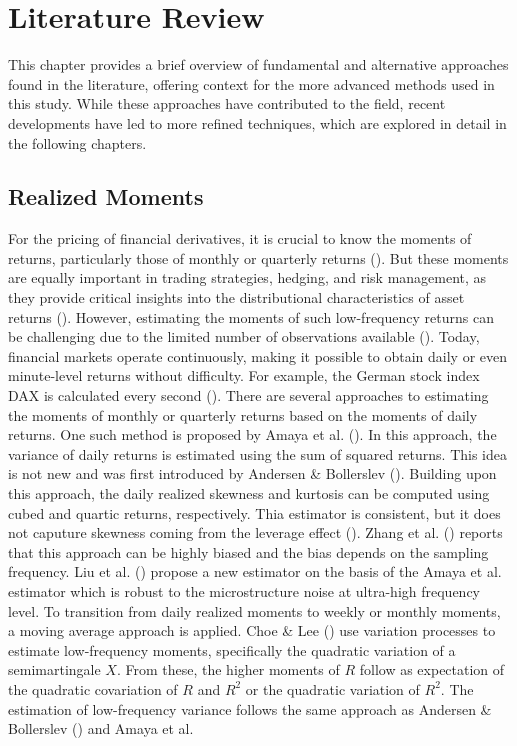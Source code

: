 \chapter{Literature Review}
\label{sec:literature}

This chapter provides a brief overview of fundamental and alternative approaches found in the literature, offering context for the more advanced methods used in this study. While these approaches have contributed to the field, recent developments have led to more refined techniques, which are explored in detail in the following chapters.

\section{Realized Moments}
For the pricing of financial derivatives, it is crucial to know the moments of returns, particularly those of monthly or quarterly returns (\cite{barroRareDisastersAsset2006}). But these moments are equally important in trading strategies, hedging, and risk management, as they provide critical insights into the distributional characteristics of asset returns (\cite{brooksOptimalHedgingHigher2012,jorionRiskManagementLessons1999,sheuEffectiveOptionsTrading2011}). However, estimating the moments of such low-frequency returns can be challenging due to the limited number of observations available (\cite{neubergerSkewnessStockMarket2021}). Today, financial markets operate continuously, making it possible to obtain daily or even minute-level returns without difficulty. For example, the German stock index DAX is calculated every second (\cite{boersefrankfurtFunktioniertBoerse}). There are several approaches to estimating the moments of monthly or quarterly returns based on the moments of daily returns. One such method is proposed by Amaya et al. (\citeyear{amayaDoesRealizedSkewness2015}). In this approach, the variance of daily returns is estimated using the sum of squared returns. This idea is not new and was first introduced by Andersen \& Bollerslev (\citeyear{andersenAnsweringSkepticsYes1998}). Building upon this approach, the daily realized skewness and kurtosis can be computed using cubed and quartic returns, respectively. Thia estimator is consistent, but it does not caputure skewness coming from the leverage effect (\cite{galloDynamicTailRisk2024}). Zhang et al. (\citeyear{zhangTaleTwoTime2005}) reports that this approach can be highly biased and the bias depends on the sampling frequency. Liu et al. (\citeyear{liuRealizedSkewnessHigh2014}) propose a new estimator on the basis of the Amaya et al. estimator which is robust to the microstructure noise at ultra-high frequency level. To transition from daily realized moments to weekly or monthly moments, a moving average approach is applied. Choe \& Lee (\citeyear{choeHighMomentVariations2014}) use variation processes to estimate low-frequency moments, specifically the quadratic variation of a semimartingale $X$. From these, the higher moments of $R$ follow as expectation of the quadratic covariation of $R$ and $R^2$ or the quadratic variation of $R^2$. The estimation of low-frequency variance follows the same approach as Andersen \& Bollerslev (\citeyear{andersenAnsweringSkepticsYes1998}) and Amaya et al. 
